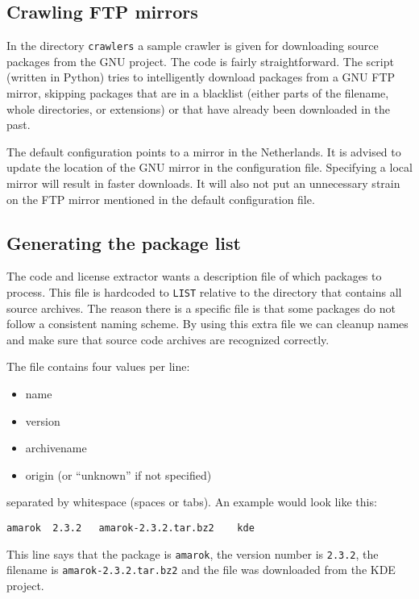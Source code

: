 \documentclass[10pt]{article}
\begin{document}
\subsection{Crawling FTP mirrors}

In the directory \texttt{crawlers} a sample crawler is given for downloading
source packages from the GNU project. The code is fairly straightforward. The
script (written in Python) tries to intelligently download packages from a GNU
FTP mirror, skipping packages that are in a blacklist (either parts of the
filename, whole directories, or extensions) or that have already been
downloaded in the past.

The default configuration points to a mirror in the Netherlands. It is advised
to update the location of the GNU mirror in the configuration file. Specifying
a local mirror will result in faster downloads. It will also not put an
unnecessary strain on the FTP mirror mentioned in the default configuration
file.

\subsection{Generating the package list}

The code and license extractor wants a description file of which packages to
process. This file is hardcoded to \texttt{LIST} relative to the directory that
contains all source archives. The reason there is a specific file is that some
packages do not follow a consistent naming scheme. By using this extra file we
can cleanup names and make sure that source code archives are recognized
correctly.

The file contains four values per line:

\begin{itemize}
\item name
\item version
\item archivename
\item origin (or ``unknown'' if not specified)
\end{itemize}

separated by whitespace (spaces or tabs). An example would look like this:

\begin{verbatim}
amarok	2.3.2	amarok-2.3.2.tar.bz2	kde
\end{verbatim}

This line says that the package is \texttt{amarok}, the version number is
\texttt{2.3.2}, the filename is \texttt{amarok-2.3.2.tar.bz2} and the file
was downloaded from the KDE project.
\end{document}
